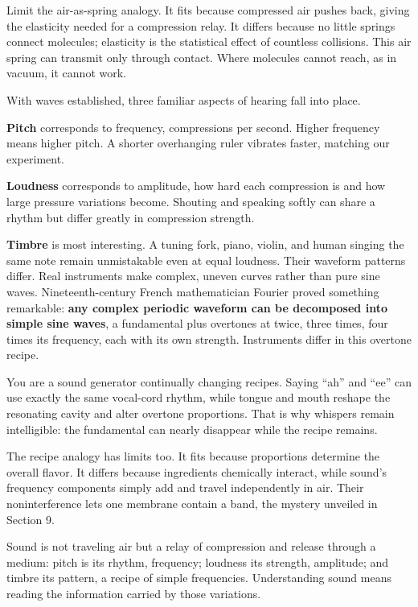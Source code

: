 \begin{mainline}
Limit the air-as-spring analogy. It fits because compressed air pushes back, giving the elasticity needed for a compression relay. It differs because no little springs connect molecules; elasticity is the statistical effect of countless collisions. This air spring can transmit only through contact. Where molecules cannot reach, as in vacuum, it cannot work.

With waves established, three familiar aspects of hearing fall into place.

\textbf{Pitch} corresponds to frequency, compressions per second. Higher frequency means higher pitch. A shorter overhanging ruler vibrates faster, matching our experiment.

\textbf{Loudness} corresponds to amplitude, how hard each compression is and how large pressure variations become. Shouting and speaking softly can share a rhythm but differ greatly in compression strength.

\textbf{Timbre} is most interesting. A tuning fork, piano, violin, and human singing the same note remain unmistakable even at equal loudness. Their waveform patterns differ. Real instruments make complex, uneven curves rather than pure sine waves. Nineteenth-century French mathematician Fourier proved something remarkable: \textbf{any complex periodic waveform can be decomposed into simple sine waves}, a fundamental plus overtones at twice, three times, four times its frequency, each with its own strength. Instruments differ in this overtone recipe.

You are a sound generator continually changing recipes. Saying ``ah'' and ``ee'' can use exactly the same vocal-cord rhythm, while tongue and mouth reshape the resonating cavity and alter overtone proportions. That is why whispers remain intelligible: the fundamental can nearly disappear while the recipe remains.

The recipe analogy has limits too. It fits because proportions determine the overall flavor. It differs because ingredients chemically interact, while sound's frequency components simply add and travel independently in air. Their noninterference lets one membrane contain a band, the mystery unveiled in Section 9.
\end{mainline}


\begin{oneline}
Sound is not traveling air but a relay of compression and release through a medium: pitch is its rhythm, frequency; loudness its strength, amplitude; and timbre its pattern, a recipe of simple frequencies. Understanding sound means reading the information carried by those variations.
\end{oneline}

